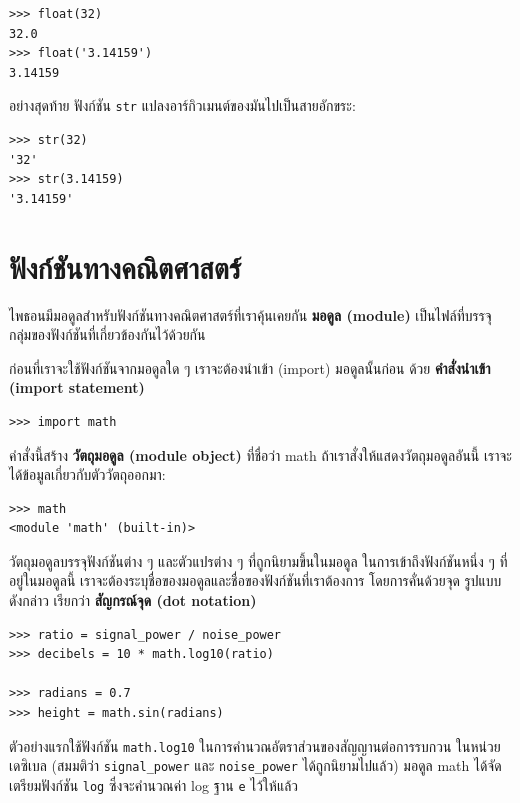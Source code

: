 \begin{verbatim}
>>> float(32)
32.0
>>> float('3.14159')
3.14159
\end{verbatim}
%
อย่างสุดท้าย ฟังก์ชัน {\tt str} แปลงอาร์กิวเมนต์ของมันไปเป็นสายอักขระ:

\begin{verbatim}
>>> str(32)
'32'
>>> str(3.14159)
'3.14159'
\end{verbatim}
%


\section{ฟังก์ชันทางคณิตศาสตร์} %

ไพธอนมีมอดูลสำหรับฟังก์ชันทางคณิตศาสตร์ที่เราคุ้นเคยกัน  {\bf มอดูล (module)} 
เป็นไฟล์ที่บรรจุกลุ่มของฟังก์ชันที่เกี่ยวข้องกันไว้ด้วยกัน

ก่อนที่เราจะใช้ฟังก์ชันจากมอดูลใด ๆ เราจะต้องนำเข้า (import) มอดูลนั้นก่อน ด้วย 
{\bf คำสั่งนำเข้า (import statement)}


\begin{verbatim}
>>> import math
\end{verbatim}
%
คำสั่งนี้สร้าง {\bf วัตถุมอดูล (module object)} ที่ชื่อว่า math 
ถ้าเราสั่งให้แสดงวัตถุมอดูลอันนี้ เราจะได้ข้อมูลเกี่ยวกับตัววัตถุออกมา:

\begin{verbatim}
>>> math
<module 'math' (built-in)>
\end{verbatim}
%
วัตถุมอดูลบรรจุฟังก์ชันต่าง ๆ และตัวแปรต่าง ๆ ที่ถูกนิยามขึ้นในมอดูล ในการเข้าถึงฟังก์ชันหนึ่ง ๆ
ที่อยู่ในมอดูลนี้ เราจะต้องระบุชื่อของมอดูลและชื่อของฟังก์ชันที่เราต้องการ โดยการคั่นด้วยจุด 
รูปแบบดังกล่าว เรียกว่า {\bf สัญกรณ์จุด (dot notation)}

\begin{verbatim}
>>> ratio = signal_power / noise_power
>>> decibels = 10 * math.log10(ratio)

>>> radians = 0.7
>>> height = math.sin(radians)
\end{verbatim}
%
ตัวอย่างแรกใช้ฟังก์ชัน \verb"math.log10" ในการคำนวณอัตราส่วนของสัญญานต่อการรบกวน 
ในหน่วยเดซิเบล (สมมติว่า \verb|signal_power| และ \verb|noise_power| ได้ถูกนิยามไปแล้ว) 
มอดูล math ได้จัดเตรียมฟังก์ชัน {\tt log} ซึ่งจะคำนวณค่า log ฐาน {\tt e} ไว้ให้แล้ว

